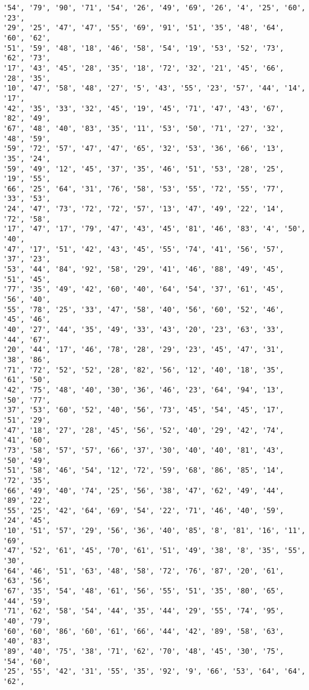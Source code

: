 \documentclass[11pt]{article}
\begin{document}
\begin{Verbatim}[commandchars=\\\{\}]
'54', '79', '90', '71', '54', '26', '49', '69', '26', '4', '25', '60', '23',
'29', '25', '47', '47', '55', '69', '91', '51', '35', '48', '64', '60', '62',
'51', '59', '48', '18', '46', '58', '54', '19', '53', '52', '73', '62', '73',
'17', '43', '45', '28', '35', '18', '72', '32', '21', '45', '66', '28', '35',
'10', '47', '58', '48', '27', '5', '43', '55', '23', '57', '44', '14', '17',
'42', '35', '33', '32', '45', '19', '45', '71', '47', '43', '67', '82', '49',
'67', '48', '40', '83', '35', '11', '53', '50', '71', '27', '32', '48', '59',
'59', '72', '57', '47', '47', '65', '32', '53', '36', '66', '13', '35', '24',
'59', '49', '12', '45', '37', '35', '46', '51', '53', '28', '25', '19', '55',
'66', '25', '64', '31', '76', '58', '53', '55', '72', '55', '77', '33', '53',
'24', '47', '73', '72', '72', '57', '13', '47', '49', '22', '14', '72', '58',
'17', '47', '17', '79', '47', '43', '45', '81', '46', '83', '4', '50', '40',
'47', '17', '51', '42', '43', '45', '55', '74', '41', '56', '57', '37', '23',
'53', '44', '84', '92', '58', '29', '41', '46', '88', '49', '45', '51', '45',
'77', '35', '49', '42', '60', '40', '64', '54', '37', '61', '45', '56', '40',
'55', '78', '25', '33', '47', '58', '40', '56', '60', '52', '46', '45', '46',
'40', '27', '44', '35', '49', '33', '43', '20', '23', '63', '33', '44', '67',
'20', '44', '17', '46', '78', '28', '29', '23', '45', '47', '31', '38', '86',
'71', '72', '52', '52', '28', '82', '56', '12', '40', '18', '35', '61', '50',
'42', '75', '48', '40', '30', '36', '46', '23', '64', '94', '13', '50', '77',
'37', '53', '60', '52', '40', '56', '73', '45', '54', '45', '17', '51', '29',
'47', '18', '27', '28', '45', '56', '52', '40', '29', '42', '74', '41', '60',
'73', '58', '57', '57', '66', '37', '30', '40', '40', '81', '43', '50', '49',
'51', '58', '46', '54', '12', '72', '59', '68', '86', '85', '14', '72', '35',
'66', '49', '40', '74', '25', '56', '38', '47', '62', '49', '44', '89', '22',
'55', '25', '42', '64', '69', '54', '22', '71', '46', '40', '59', '24', '45',
'10', '51', '57', '29', '56', '36', '40', '85', '8', '81', '16', '11', '69',
'47', '52', '61', '45', '70', '61', '51', '49', '38', '8', '35', '55', '30',
'64', '46', '51', '63', '48', '58', '72', '76', '87', '20', '61', '63', '56',
'67', '35', '54', '48', '61', '56', '55', '51', '35', '80', '65', '44', '59',
'71', '62', '58', '54', '44', '35', '44', '29', '55', '74', '95', '40', '79',
'60', '60', '86', '60', '61', '66', '44', '42', '89', '58', '63', '40', '83',
'89', '40', '75', '38', '71', '62', '70', '48', '45', '30', '75', '54', '60',
'25', '55', '42', '31', '55', '35', '92', '9', '66', '53', '64', '64', '62',

\end{Verbatim}
\end{document}
